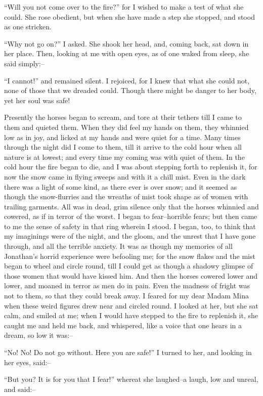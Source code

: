 \documentclass[12pt,openright]{book}
\begin{document}
“Will you not come over to the fire?” for I wished to make a test of what she could. She rose obedient, but when she have made a step she stopped, and stood as one stricken.

“Why not go on?” I asked. She shook her head, and, coming back, sat down in her place. Then, looking at me with open eyes, as of one waked from sleep, she said simply:–

“I cannot!” and remained silent. I rejoiced, for I knew that what she could not, none of those that we dreaded could. Though there might be danger to her body, yet her soul was safe!

Presently the horses began to scream, and tore at their tethers till I came to them and quieted them. When they did feel my hands on them, they whinnied low as in joy, and licked at my hands and were quiet for a time. Many times through the night did I come to them, till it arrive to the cold hour when all nature is at lowest; and every time my coming was with quiet of them. In the cold hour the fire began to die, and I was about stepping forth to replenish it, for now the snow came in flying sweeps and with it a chill mist. Even in the dark there was a light of some kind, as there ever is over snow; and it seemed as though the snow-flurries and the wreaths of mist took shape as of women with trailing garments. All was in dead, grim silence only that the horses whinnied and cowered, as if in terror of the worst. I began to fear–horrible fears; but then came to me the sense of safety in that ring wherein I stood. I began, too, to think that my imaginings were of the night, and the gloom, and the unrest that I have gone through, and all the terrible anxiety. It was as though my memories of all Jonathan’s horrid experience were befooling me; for the snow flakes and the mist began to wheel and circle round, till I could get as though a shadowy glimpse of those women that would have kissed him. And then the horses cowered lower and lower, and moaned in terror as men do in pain. Even the madness of fright was not to them, so that they could break away. I feared for my dear Madam Mina when these weird figures drew near and circled round. I looked at her, but she sat calm, and smiled at me; when I would have stepped to the fire to replenish it, she caught me and held me back, and whispered, like a voice that one hears in a dream, so low it was:–

“No! No! Do not go without. Here you are safe!” I turned to her, and looking in her eyes, said:–

“But you? It is for you that I fear!” whereat she laughed–a laugh, low and unreal, and said:–
\end{document}
